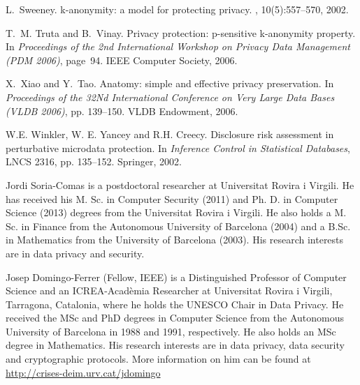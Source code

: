 \documentclass[10pt,journal,compsoc]{IEEEtran}
\theoremstyle{definition}
\theoremstyle{plain}
\begin{document}
\begin{thebibliography}{10}
	L.~Sweeney.
	\newblock k-anonymity: a model for protecting privacy.
	, 10(5):557--570, 2002.
	
	T.~M. Truta and B.~Vinay.
	\newblock Privacy protection: p-sensitive k-anonymity property.
	\newblock In {\em Proceedings of the 2nd
		International Workshop on Privacy Data Management (PDM 2006)}, page~94. IEEE
	Computer Society, 2006.
	
	X.~Xiao and Y.~Tao.
	\newblock Anatomy: simple and effective privacy preservation.
	\newblock In {\em Proceedings of the 32Nd International Conference on Very
		Large Data Bases (VLDB 2006)}, pp. 139--150. VLDB Endowment,
	2006.
	
	W.E. Winkler, W. E. Yancey and R.H. Creecy.
	\newblock Disclosure risk assessment in perturbative microdata protection.
	\newblock In {\em Inference Control in
		Statistical Databases}, LNCS 2316, 
		pp. 135--152. Springer, 2002.
	
\end{thebibliography}





\begin{IEEEbiography}{Jordi Soria-Comas}
is a postdoctoral researcher at Universitat Rovira i Virgili. He has received his M. Sc. in Computer Security (2011) and Ph. D. in Computer Science (2013) degrees from the Universitat Rovira i Virgili. He also holds a M. Sc. in Finance from the Autonomous University of Barcelona (2004) and a B.Sc. in Mathematics from the University of Barcelona (2003). His research interests are in data privacy and security.
\end{IEEEbiography}

\begin{IEEEbiography}{Josep Domingo-Ferrer}
(Fellow, IEEE) 
is a Distinguished Professor of Computer Science and
an ICREA-Acad\`emia Researcher at Universitat Rovira i Virgili,
Tarragona, Catalonia, where he holds the UNESCO Chair in Data Privacy.
He received the MSc and
PhD degrees in Computer Science from
the Autonomous University of Barcelona in 1988 and
1991, respectively. He also holds an MSc degree in
Mathematics. 
His research interests are in data privacy, data security and cryptographic
protocols. More information on him can be found 
at \url{http://crises-deim.urv.cat/jdomingo}
\end{IEEEbiography}
\end{document}
